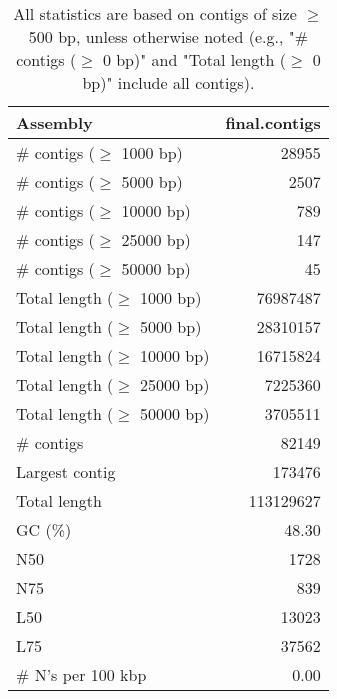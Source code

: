 \documentclass[12pt,a4paper]{article}
\begin{document}
\begin{table}[ht]
\begin{center}
\caption{All statistics are based on contigs of size $\geq$ 500 bp, unless otherwise noted (e.g., "\# contigs ($\geq$ 0 bp)" and "Total length ($\geq$ 0 bp)" include all contigs).}
\begin{tabular}{|l*{1}{|r}|}
\hline
Assembly & final.contigs \\ \hline
\# contigs ($\geq$ 1000 bp) & 28955 \\ \hline
\# contigs ($\geq$ 5000 bp) & 2507 \\ \hline
\# contigs ($\geq$ 10000 bp) & 789 \\ \hline
\# contigs ($\geq$ 25000 bp) & 147 \\ \hline
\# contigs ($\geq$ 50000 bp) & 45 \\ \hline
Total length ($\geq$ 1000 bp) & 76987487 \\ \hline
Total length ($\geq$ 5000 bp) & 28310157 \\ \hline
Total length ($\geq$ 10000 bp) & 16715824 \\ \hline
Total length ($\geq$ 25000 bp) & 7225360 \\ \hline
Total length ($\geq$ 50000 bp) & 3705511 \\ \hline
\# contigs & 82149 \\ \hline
Largest contig & 173476 \\ \hline
Total length & 113129627 \\ \hline
GC (\%) & 48.30 \\ \hline
N50 & 1728 \\ \hline
N75 & 839 \\ \hline
L50 & 13023 \\ \hline
L75 & 37562 \\ \hline
\# N's per 100 kbp & 0.00 \\ \hline
\end{tabular}
\end{center}
\end{table}
\end{document}
